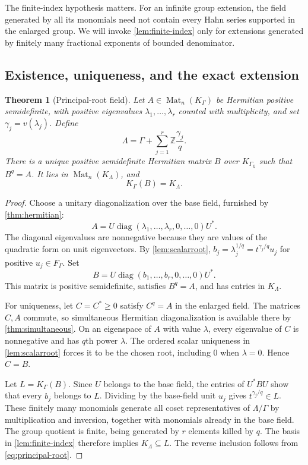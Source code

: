 \documentclass[11pt,letterpaper]{article}
\numberwithin{equation}{section}
\newtheorem{theorem}{Theorem}[section]
\theoremstyle{definition}
\theoremstyle{remark}
\newcommand{\Q}{\mathbb Q}
\newcommand{\Z}{\mathbb Z}
\newcommand{\Mat}{\operatorname{Mat}}
\newcommand{\diag}{\operatorname{diag}}
\newcommand{\KG}{K_{\Gamma}}
\newcommand{\FG}{F_{\Gamma}}
\begin{document}
The finite-index hypothesis matters. For an infinite group extension, the
field generated by all its monomials need not contain every Hahn series
supported in the enlarged group. We will invoke \cref{lem:finite-index} only
for extensions generated by finitely many fractional exponents of bounded
denominator.

\subsection{Existence, uniqueness, and the exact extension}

\begin{theorem}[Principal-root field]\label{thm:rootfield}
Let $A\in\Mat_n(\KG)$ be Hermitian positive semidefinite, with positive
eigenvalues $\lambda_1,\ldots,\lambda_r$ counted with multiplicity, and set
$\gamma_j=v(\lambda_j)$. Define
\[
 \Lambda=\Gamma+\sum_{j=1}^r\Z\frac{\gamma_j}{q}.
\]
There is a unique positive semidefinite Hermitian matrix $B$ over
$K_{\Gamma_{\Q}}$ such that $B^q=A$. It lies in $\Mat_n(K_\Lambda)$, and
\begin{equation}\label{eq:exact-root-field}
 K_\Gamma(B)=K_\Lambda.
\end{equation}
\end{theorem}
\begin{proof}
Choose a unitary diagonalization over the base field, furnished by
\cref{thm:hermitian}:
\[
 A=U\diag(\lambda_1,\ldots,\lambda_r,0,\ldots,0)U^*.
\]
The diagonal eigenvalues are nonnegative because they are values of the
quadratic form on unit eigenvectors. By \cref{lem:scalarroot},
$b_j=\lambda_j^{1/q}=t^{\gamma_j/q}u_j$ for positive $u_j\in\FG$.
Set
\begin{equation}\label{eq:principal-root}
 B=U\diag(b_1,\ldots,b_r,0,\ldots,0)U^*.
\end{equation}
This matrix is positive semidefinite, satisfies $B^q=A$, and has entries
in $K_\Lambda$.

For uniqueness, let $C=C^*\ge0$ satisfy $C^q=A$ in the enlarged field.
The matrices $C,A$ commute, so simultaneous Hermitian diagonalization is
available there by \cref{thm:simultaneous}. On an eigenspace of $A$ with
value $\lambda$, every eigenvalue of $C$ is nonnegative and has $q$th power
$\lambda$. The ordered scalar uniqueness in \cref{lem:scalarroot} forces
it to be the chosen root, including $0$ when $\lambda=0$. Hence $C=B$.

Let $L=K_\Gamma(B)$. Since $U$ belongs to the base field, the entries of
$U^*BU$ show that every $b_j$ belongs to $L$. Dividing by the base-field
unit $u_j$ gives $t^{\gamma_j/q}\in L$. These finitely many monomials generate
all coset representatives of $\Lambda/\Gamma$ by multiplication and
inversion, together with monomials already in the base field. The group
quotient is finite, being generated by $r$ elements killed by $q$.
The basis in \cref{lem:finite-index} therefore implies $K_\Lambda\subseteq L$.
The reverse inclusion follows from \cref{eq:principal-root}.
\end{proof}
\end{document}
